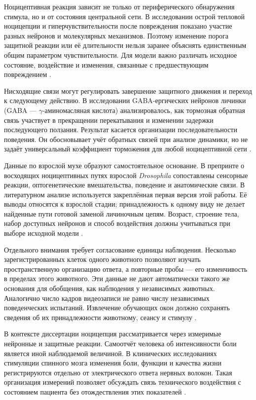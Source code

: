 Ноцицептивная реакция зависит не только от периферического обнаружения стимула, но и от состояния центральной сети. В исследовании острой тепловой ноцицепции и гиперчувствительности после повреждения показано участие разных нейронов и молекулярных механизмов. Поэтому изменение порога защитной реакции или её длительности нельзя заранее объяснять единственным общим параметром чувствительности. Для модели важно различать исходное состояние, воздействие и изменения, связанные с предшествующим повреждением \cite{s901}.

Нисходящие связи могут регулировать завершение защитного движения и переход к следующему действию. В исследовании GABA-ергических нейронов личинки (GABA --- $\gamma$-аминомасляная кислота) анализировалось, как тормозная обратная связь участвует в прекращении перекатывания и изменении задержки последующего ползания. Результат касается организации последовательности поведения. Он обосновывает учёт обратных связей при анализе динамики, но не задаёт универсальный коэффициент торможения для любой ноцицептивной сети \cite{s910}.

Данные по взрослой мухе образуют самостоятельное основание. В препринте о восходящих ноцицептивных путях взрослой \textit{Drosophila} сопоставлены сенсорные реакции, оптогенетические вмешательства, поведение и анатомические связи. В литературном анализе используется закреплённая первая версия этой работы. Её выводы относятся к взрослой стадии; принадлежность к одному виду не делает найденные пути готовой заменой личиночным цепям. Возраст, строение тела, набор доступных нейронов и способ воздействия должны учитываться при выборе исходной модели \cite{s029}.

Отдельного внимания требует согласование единицы наблюдения. Несколько зарегистрированных клеток одного животного позволяют изучать пространственную организацию ответа, а повторные пробы --- его изменчивость в пределах этого животного. Эти данные не дают автоматически такого же основания для обобщения, как наблюдения у независимых животных. Аналогично число кадров видеозаписи не равно числу независимых поведенческих испытаний. Извлечение обучающих окон должно сохранять сведения об их принадлежности животному, сеансу и стимулу \cite{s212,s910}.

В контексте диссертации ноцицепция рассматривается через измеримые нейронные и защитные реакции. Самоотчёт человека об интенсивности боли является иной наблюдаемой величиной. В клинических исследованиях стимуляции спинного мозга изменения боли, функции и качества жизни регистрируются отдельно от электрического ответа нервных волокон. Такая организация измерений позволяет обсуждать связь технического воздействия с состоянием пациента без отождествления этих показателей \cite{s780,s781}.

